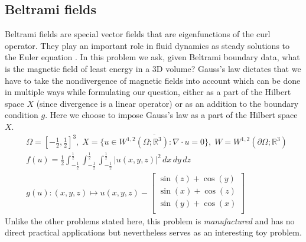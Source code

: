\subsection{Beltrami fields} Beltrami fields are special vector fields that are eigenfunctions of the curl operator. They play an important role in fluid dynamics as steady solutions to the Euler equation \cite{aris2012vectors}. In this problem we ask, given Beltrami boundary data, what is the magnetic field of least energy in a 3D volume? Gauss's law \cite{jackson1999classical} dictates that we have to take the nondivergence of magnetic fields into account which can be done in multiple ways while formulating our question, either as a part of the Hilbert space $X$ (since divergence is a linear operator) or as an addition to the boundary condition $g$. Here we choose to impose Gauss's law as a part of the Hilbert space $X$.
\begin{equation}
    \begin{aligned}
&\Omega = \left[-\frac{1}{2}, \frac{1}{2}\right]^3,\; X=\overline{\{u\in W^{1,2}(\Omega; \mathbb R^3):\nabla\cdot u=0\}},\;W=W^{1,2}(\partial\Omega;\mathbb R^3)\\
    &f(u) = \frac{1}{2}\int_{-\frac{1}{2}}^{\frac{1}{2}}\int_{-\frac{1}{2}}^{\frac{1}{2}}\int_{-\frac{1}{2}}^{\frac{1}{2}}|u(x, y, z)|^2\,dx\,dy\,dz\\
    & g(u): (x, y, z)\mapsto u(x, y, z) - \begin{bmatrix}
\sin(z) + \cos(y) \\
\sin(x) + \cos(z) \\
\sin(y) + \cos(x) \\
\end{bmatrix}
    \end{aligned}
\end{equation}
Unlike the other problems stated here, this problem is \textit{manufactured} and has no direct practical applications but nevertheless serves as an interesting toy problem.